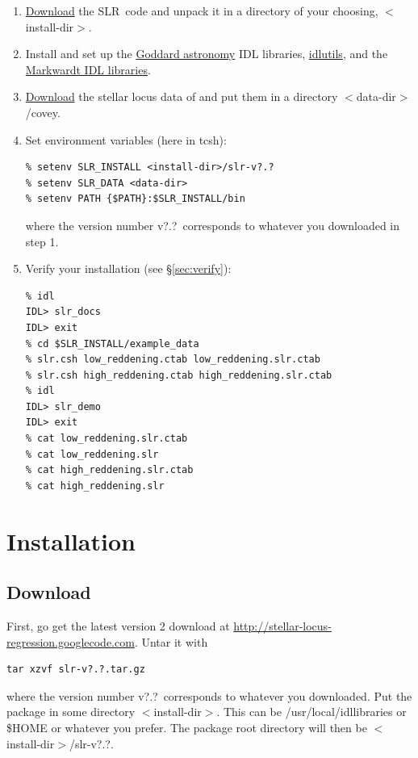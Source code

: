 \documentclass{report}
\newcommand{\slr}{SLR}
\begin{document}
\begin{enumerate}
\item \href{http://stellar-locus-regression.googlecode.com}{Download}
  the \slr\ code and unpack it in a directory of your choosing,
  $<$install-dir$>$.
\item Install and set up the \href{http://idlastro.gsfc.nasa.gov}{Goddard
    astronomy} IDL libraries,
  \href{http://www.astro.princeton.edu/~schlegel/code.html}{idlutils},
  and the \href{http://www.physics.wisc.edu/~craigm/idl}{Markwardt IDL
    libraries}.
\item
  \href{http://www.cfa.harvard.edu/~kcovey/research/medianlocus.tbl}{Download}
  the stellar locus data of \citet{bib:covey} and put them in a
  directory $<$data-dir$>$/covey.
\item Set environment variables (here in tcsh):
\begin{verbatim}
% setenv SLR_INSTALL <install-dir>/slr-v?.?
% setenv SLR_DATA <data-dir>
% setenv PATH {$PATH}:$SLR_INSTALL/bin
\end{verbatim}
  where the version number v?.?\ corresponds to whatever you
  downloaded in step 1.
\item Verify your installation (see \S\ref{sec:verify}):
\begin{verbatim}
% idl
IDL> slr_docs
IDL> exit
% cd $SLR_INSTALL/example_data
% slr.csh low_reddening.ctab low_reddening.slr.ctab
% slr.csh high_reddening.ctab high_reddening.slr.ctab
% idl
IDL> slr_demo
IDL> exit
% cat low_reddening.slr.ctab
% cat low_reddening.slr
% cat high_reddening.slr.ctab
% cat high_reddening.slr
\end{verbatim}
\end{enumerate}


\chapter{Installation}

\section{Download}

First, go get the latest version 2 download at
\url{http://stellar-locus-regression.googlecode.com}. Untar
it with
\begin{verbatim}
tar xzvf slr-v?.?.tar.gz
\end{verbatim}
where the version number v?.?\ corresponds to whatever you downloaded.
Put the package in some directory $<$install-dir$>$. This can be
/usr/local/idllibraries or \$HOME or whatever you prefer. The package
root directory will then be $<$install-dir$>$/slr-v?.?.
\end{document}
